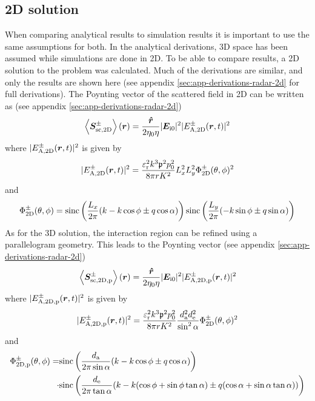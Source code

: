 \documentclass[11pt,twoside]{eitExjobb}
\begin{document}
	\subsection{2D solution}
	When comparing analytical results to simulation results it is important to use the same assumptions for both. In the analytical derivations, 3D space has been assumed while simulations are done in 2D. To be able to compare results, a 2D solution to the problem was calculated. Much of the derivations are similar, and only the results are shown here (see appendix \ref{sec:app-derivations-radar-2d} for full derivations). The Poynting vector of the scattered field in 2D can be written as (see appendix \ref{sec:app-derivations-radar-2d})
	\begin{equation}
		\left< \bm{S}_{\mathrm{sc,2D}}^\pm \right> (\bm{r}) = \frac{\bm{\hat{r}}}{2\eta_0 \eta} |\bm{E}_{\mathrm{i}0}|^2 |E_{\mathrm{A,2D}}^\pm (\bm{r},t)|^2
		\label{eq:an-2d-power-cuboid}
	\end{equation}
	where $|E_{\mathrm{A,2D}}^\pm (\bm{r},t)|^2$ is given by
	\begin{equation*}
		|E_{\mathrm{A,2D}}^\pm (\bm{r},t)|^2 = \frac{\varepsilon_{\mathrm{r}}^2 k^3 \mathfrak{p}^2 p_0^2}{8\pi r K^2} L_{x}^2 L_{y}^2 \Phi_{\mathrm{2D}}^\pm (\theta,\phi)^2
	\end{equation*}
	and
	\begin{equation*}
		\Phi_{\mathrm{2D}}^\pm (\theta,\phi) = \text{sinc} \left( \frac{L_{x}}{2\pi} ( k - k\cos{\phi} \pm q\cos{\alpha} ) \right) \text{sinc} \left( \frac{L_{y}}{2\pi} ( - k\sin{\phi} \pm q\sin{\alpha} ) \right)
	\end{equation*}
	As for the 3D solution, the interaction region can be refined using a parallelogram geometry. This leads to the Poynting vector (see appendix \ref{sec:app-derivations-radar-2d})
	\begin{equation}
		\left< \bm{S}_{\mathrm{sc,2D,p}}^\pm \right> (\bm{r}) = \frac{\bm{\hat{r}}}{2\eta_0 \eta} |\bm{E}_{\mathrm{i}0}|^2 |E_{\mathrm{A,2D,p}}^\pm (\bm{r},t)|^2
		\label{eq:an-2d-power-parallelogram}
	\end{equation}
	where $|E_{\mathrm{A,2D,p}}^\pm (\bm{r},t)|^2$ is given by
	\begin{equation*}
		|E_{\mathrm{A,2D,p}}^\pm (\bm{r},t)|^2 = \frac{\varepsilon_{\mathrm{r}}^2 k^3 \mathfrak{p}^2 p_0^2}{8\pi r K^2} \frac{d_{\mathrm{a}}^2 d_{\mathrm{e}}^2}{\sin^2{\alpha}} \Phi_{\mathrm{2D}}^\pm (\theta,\phi)^2
	\end{equation*}
	and
	\begin{equation*}
	\begin{split}
		\Phi_{\mathrm{2D,p}}^\pm (\theta,\phi) = &\text{sinc}\left( \frac{d_{\mathrm{a}}}{2\pi \sin{\alpha}}(k - k\cos{\phi} \pm q\cos{\alpha}) \right) \\
		\cdot &\text{sinc}\left( \frac{d_{\mathrm{e}}}{2\pi \tan{\alpha}}
		(k - k(\cos{\phi} + \sin{\phi}\tan{\alpha}) \pm q(\cos{\alpha} + \sin{\alpha}\tan{\alpha})) \right)
	\end{split}
	\end{equation*}
	
\end{document}
